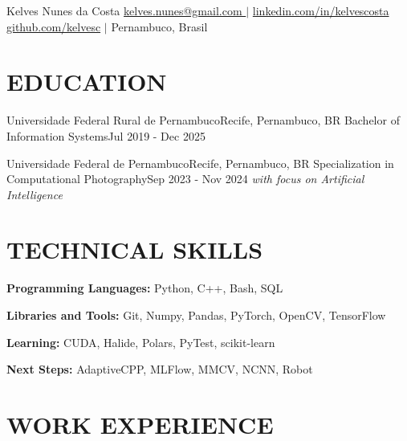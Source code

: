 \documentclass[letterpaper,11pt]{article}
\begin{document}
\begin{center}
{\huge Kelves Nunes da Costa}
\linebreak
\href{mailto:[kelves.nunes@gmail.com]}{kelves.nunes@gmail.com }
\small{$\vert$}
\href{https://www.linkedin.com/in/kelvescosta/}{linkedin.com/in/kelvescosta}
\linebreak
\href{https://github.com/kelvesc}{github.com/kelvesc}
\small{$\vert$}
{Pernambuco, Brasil}
\end{center}


\section{\texorpdfstring{EDUCATION}{EDUCATION}}
\resumeSubHeadingListStart

\resumeSubheading
{Universidade Federal Rural de Pernambuco}{Recife, Pernambuco, BR}
{Bachelor of Information Systems}{Jul 2019 - Dec 2025}

\resumeSubheading
{Universidade Federal de Pernambuco}{Recife, Pernambuco, BR}
{Specialization in Computational Photography}{Sep 2023 - Nov 2024}
\textit{\large{with focus on Artificial Intelligence}}

\resumeSubHeadingListEnd


\section{\texorpdfstring{TECHNICAL SKILLS}{TECHNICAL SKILLS}}
\begin{itemize}[leftmargin=0in, label={}, itemsep=0pt]
\small{
	\item \textbf{Programming Languages:} {Python, C++, Bash, SQL}
	\item \textbf{Libraries and Tools:} {Git, Numpy, Pandas, PyTorch,
	OpenCV, TensorFlow}
	\item \textbf{Learning:} {CUDA, Halide, Polars, PyTest, scikit-learn}
	\item \textbf{Next Steps:} {AdaptiveCPP, MLFlow, MMCV, NCNN, Robot}
}
\end{itemize}


\section{\texorpdfstring{WORK EXPERIENCE}{WORK EXPERIENCE}}
\resumeSubHeadingListStart
\end{document}
